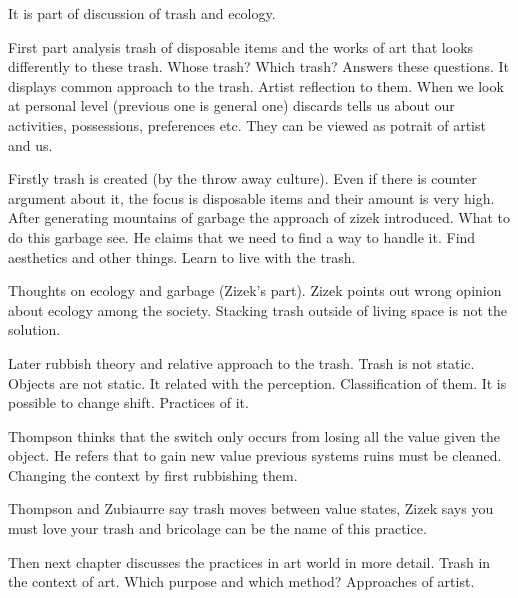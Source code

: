 It is part of discussion of trash and ecology.

First part analysis trash of disposable items and the works of art that looks differently to these trash. Whose trash? Which trash? Answers these questions. It displays common approach to the trash. Artist reflection to them. When we look at personal level (previous one is general one) discards tells us about our activities, possessions, preferences etc. They can be viewed as potrait of artist and us.

Firstly trash is created (by the throw away culture). Even if there is counter argument about it, the focus is disposable items and their amount is very high. After generating mountains of garbage the approach of zizek introduced. What to do this garbage see. He claims that we need to find a way to handle it. Find aesthetics and other things. Learn to live with the trash.

Thoughts on ecology and garbage (Zizek's part). Zizek points out wrong opinion about ecology among the society. Stacking trash outside of living space is not the solution.


Later rubbish theory and relative approach to the trash. Trash is not static. Objects are not static. It related with the perception. Classification of them. It is possible to change shift. Practices of it.

Thompson thinks that the switch only occurs from losing all the value given the object. He refers that to gain new value previous systems ruins must be cleaned. Changing the context by first rubbishing them.

Thompson and Zubiaurre say trash moves between value states, Zizek says you must love your trash and bricolage can be the name of this practice.

Then next chapter discusses the practices in art world in more detail. Trash in the context of art. Which purpose and which method? Approaches of artist.
